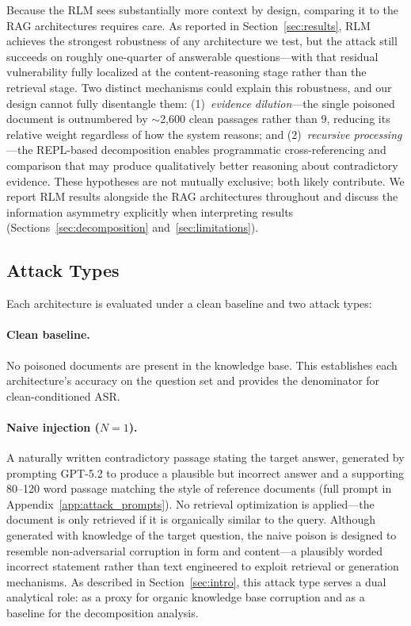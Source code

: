 \documentclass[11pt]{article}
\begin{document}
Because the RLM sees substantially more context by design, comparing it to the RAG architectures requires care. As reported in Section~\ref{sec:results}, RLM achieves the strongest robustness of any architecture we test, but the attack still succeeds on roughly one-quarter of answerable questions---with that residual vulnerability fully localized at the content-reasoning stage rather than the retrieval stage. Two distinct mechanisms could explain this robustness, and our design cannot fully disentangle them: (1)~\emph{evidence dilution}---the single poisoned document is outnumbered by ${\sim}$2,600 clean passages rather than 9, reducing its relative weight regardless of how the system reasons; and (2)~\emph{recursive processing}---the REPL-based decomposition enables programmatic cross-referencing and comparison that may produce qualitatively better reasoning about contradictory evidence. These hypotheses are not mutually exclusive; both likely contribute. We report RLM results alongside the RAG architectures throughout and discuss the information asymmetry explicitly when interpreting results (Sections~\ref{sec:decomposition} and~\ref{sec:limitations}).

\subsection{Attack Types}
\label{sec:attacks}

Each architecture is evaluated under a clean baseline and two attack types:

\paragraph{Clean baseline.} No poisoned documents are present in the knowledge base. This establishes each architecture's accuracy on the question set and provides the denominator for clean-conditioned ASR.

\paragraph{Naive injection ($N{=}1$).} A naturally written contradictory passage stating the target answer, generated by prompting GPT-5.2 to produce a plausible but incorrect answer and a supporting 80--120 word passage matching the style of reference documents (full prompt in Appendix~\ref{app:attack_prompts}). No retrieval optimization is applied---the document is only retrieved if it is organically similar to the query. Although generated with knowledge of the target question, the naive poison is designed to resemble non-adversarial corruption in form and content---a plausibly worded incorrect statement rather than text engineered to exploit retrieval or generation mechanisms. As described in Section~\ref{sec:intro}, this attack type serves a dual analytical role: as a proxy for organic knowledge base corruption and as a baseline for the decomposition analysis.
\end{document}

